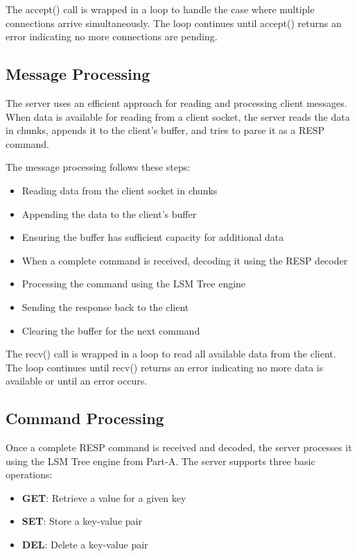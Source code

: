 \documentclass{article}
\begin{document}
\noindent The accept() call is wrapped in a loop to handle the case where multiple connections arrive simultaneously. The loop continues until accept() returns an error indicating no more connections are pending.

\subsection{Message Processing}

The server uses an efficient approach for reading and processing client messages. When data is available for reading from a client socket, the server reads the data in chunks, appends it to the client's buffer, and tries to parse it as a RESP command.

\noindent The message processing follows these steps:
\begin{itemize}
    \item Reading data from the client socket in chunks
    \item Appending the data to the client's buffer
    \item Ensuring the buffer has sufficient capacity for additional data
    \item When a complete command is received, decoding it using the RESP decoder
    \item Processing the command using the LSM Tree engine
    \item Sending the response back to the client
    \item Clearing the buffer for the next command
\end{itemize}

\noindent The recv() call is wrapped in a loop to read all available data from the client. The loop continues until recv() returns an error indicating no more data is available or until an error occurs.

\subsection{Command Processing}

Once a complete RESP command is received and decoded, the server processes it using the LSM Tree engine from Part-A. The server supports three basic operations:

\begin{itemize}
    \item \textbf{GET}: Retrieve a value for a given key
    \item \textbf{SET}: Store a key-value pair
    \item \textbf{DEL}: Delete a key-value pair
\end{itemize}
\end{document}
